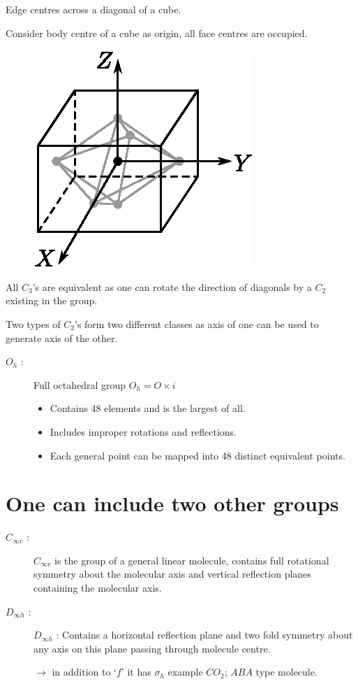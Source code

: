 Edge centres across a diagonal of a cube.

Consider body centre of a cube as origin, all face centres are occupied.
\begin{figure}[H]
\centering
\includegraphics[scale=.8]{images/lecture11/fig3.eps}
\end{figure}

All $C_{3}$'s are equivalent as one can rotate the direction of diagonals by a $C_{2}$ existing in the group.

Two types of $C_{2}$'s form two different classes as axis of one can be used to generate axis of the other.
\begin{description}
\item[$O_{h}$ :] Full octahedral group $O_{h}=O\times i$
\begin{itemize}
\item Contains 48 elements and is the largest of all.

\item Includes improper rotations and reflections.

\item Each general point can be mapped into 48 distinct equivalent points.
\end{itemize}
\end{description}

\section*{One can include two other groups}
\begin{description}
\item[$C_{\infty v}$ :] $C_{\infty v}$ is the group of a general linear molecule, contains full rotational symmetry about the molecular axis and vertical reflection planes containing the molecular axis.

\item[$D_{\infty h}$ :] $D_{\infty h}$ : Contains a horizontal reflection plane and two fold symmetry about any axis on this plane passing through molecule centre.

$\to$ in addition to `$f$' it has $\sigma_{h}$ example $CO_{2}$; $ABA$ type molecule.
\end{description}

